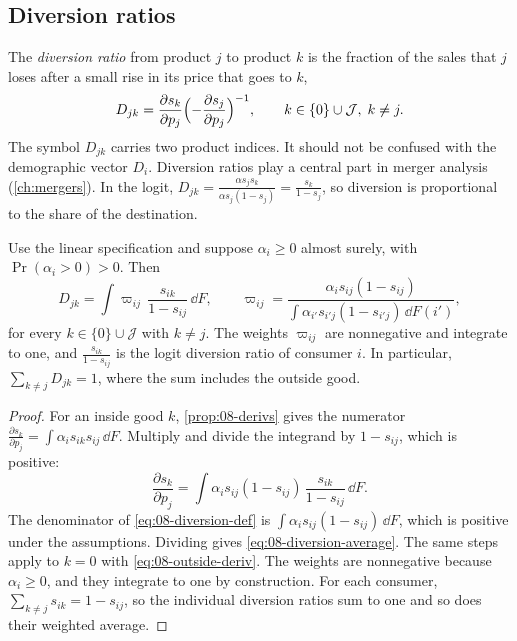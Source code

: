 \subsection{Diversion ratios}\label{sec:08-diversion}

The \emph{diversion ratio} from product $j$ to product $k$ is the fraction of the sales that $j$ loses after a
small rise in its price that goes to $k$,
\begin{equation}\label{eq:08-diversion-def}
  D_{jk} = \frac{\partial s_k}{\partial p_j}\Bigl(-\frac{\partial s_j}{\partial p_j}\Bigr)^{-1},
  \qquad k \in \{0\} \cup \mathcal{J}, \; k \ne j.
\end{equation}
The symbol $D_{jk}$ carries two product indices. It should not be confused with the demographic vector $D_i$.
Diversion ratios play a central part in merger analysis (\cref{ch:mergers}). In the logit,
$D_{jk} = \frac{\alpha s_j s_k}{\alpha s_j(1 - s_j)} = \frac{s_k}{1 - s_j}$, so diversion is proportional to
the share of the destination.

\begin{proposition}\label{prop:08-diversion}
Use the linear specification and suppose $\alpha_i \ge 0$ almost surely, with $\Pr(\alpha_i > 0) > 0$. Then
\begin{equation}\label{eq:08-diversion-average}
  D_{jk} = \int \varpi_{ij}\, \frac{s_{ik}}{1 - s_{ij}}\, \dd F, \qquad
  \varpi_{ij} = \frac{\alpha_i s_{ij}(1 - s_{ij})}{\int \alpha_{i'} s_{i'j}(1 - s_{i'j})\, \dd F(i')},
\end{equation}
for every $k \in \{0\} \cup \mathcal{J}$ with $k \ne j$. The weights $\varpi_{ij}$ are nonnegative and integrate
to one, and $\frac{s_{ik}}{1 - s_{ij}}$ is the logit diversion ratio of consumer $i$. In particular,
$\sum_{k \ne j} D_{jk} = 1$, where the sum includes the outside good.
\end{proposition}

\begin{proof}
For an inside good $k$, \cref{prop:08-derivs} gives the numerator $\frac{\partial s_k}{\partial p_j} = \int
\alpha_i s_{ik}s_{ij}\, \dd F$. Multiply and divide the integrand by $1 - s_{ij}$, which is positive:
\begin{equation*}
  \frac{\partial s_k}{\partial p_j} = \int \alpha_i s_{ij}(1 - s_{ij})\, \frac{s_{ik}}{1 - s_{ij}}\, \dd F.
\end{equation*}
The denominator of \eqref{eq:08-diversion-def} is $\int \alpha_i s_{ij}(1 - s_{ij})\, \dd F$, which is
positive under the assumptions. Dividing gives \eqref{eq:08-diversion-average}. The same steps apply to $k = 0$
with \eqref{eq:08-outside-deriv}. The weights are nonnegative because $\alpha_i \ge 0$, and they integrate to
one by construction. For each consumer, $\sum_{k \ne j} s_{ik} = 1 - s_{ij}$, so the individual diversion
ratios sum to one and so does their weighted average.
\end{proof}

